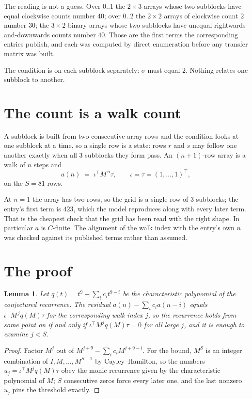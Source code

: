\documentclass[11pt,a4paper]{article}
\theoremstyle{plain}
\newtheorem{lemma}[theorem]{Lemma}
\theoremstyle{definition}
\begin{document}
The reading is not a guess. Over $0..1$ the $2\times3$ arrays whose two subblocks have equal
clockwise counts number $40$; over $0..2$ the $2\times2$ arrays of clockwise count $2$ number
$30$; the $3\times2$ binary arrays whose two subblocks have unequal rightwards-and-downwards
counts number $40$. Those are the first terms the corresponding entries publish, and each was
computed by direct enumeration before any transfer matrix was built.

The condition is on each subblock separately: $\sigma$ must equal $2$. Nothing
relates one subblock to another.

\section{The count is a walk count}

A subblock is built from two consecutive array rows and the condition looks
at one subblock at a time, so a single row is a state: rows $r$ and $s$ may follow one another
exactly when all $3$ subblocks they form pass. An $(n+1)$-row array is a walk of $n$ steps and
\[
a(n)\;=\;\iota^{\!\top}M^{\,n}\tau,\qquad\iota=\tau=(1,\dots,1)^{\!\top},
\]
on the $S=81$ rows.

At $n=1$ the array has two rows, so the grid is a single row of $3$
subblocks; the entry's first term is $423$, which the model
reproduces along with every later term. That is the cheapest check that the grid has been read
with the right shape.
In particular $a$ is $C$-finite. The alignment of the walk index with the entry's own $n$ was
checked against its published terms rather than assumed.

\section{The proof}

\begin{lemma}\label{lem:crit}
Let $q(t)=t^{9}-\sum_i c_it^{9-i}$ be the characteristic polynomial of the
conjectured recurrence. The residual $a(n)-\sum_ic_ia(n-i)$ equals
$\iota^{\!\top}M^{\,j}q(M)\tau$ for the corresponding walk index $j$, so the recurrence
holds from some point on if and only if $\iota^{\!\top}M^{j}q(M)\tau=0$ for all large $j$,
and it is enough to examine $j<S$.
\end{lemma}

\begin{proof}
Factor $M^{j}$ out of $M^{j+9}-\sum_ic_iM^{j+9-i}$. For the bound, $M^{S}$
is an integer combination of $I,M,\dots,M^{S-1}$ by Cayley--Hamilton, so the numbers
$u_j=\iota^{\!\top}M^{j}q(M)\tau$ obey the monic recurrence given by the characteristic
polynomial of $M$; $S$ consecutive zeros force every later one, and the last nonzero $u_j$
pins the threshold exactly.
\end{proof}
\end{document}
